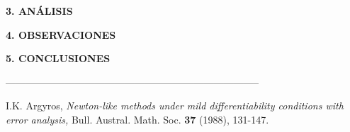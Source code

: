 \documentclass[10pt,a4paper]{article}
\begin{document}
\begin{multicols}{2}
\begin{center}
{\large \bf 3. AN\'ALISIS}	
\end{center}

\begin{center}
{\large \bf 4. OBSERVACIONES}
\end{center}

\begin{center}
{\large \bf 5. CONCLUSIONES}
\end{center}


\end{multicols}

\begin{center}
 -----------------------------------------------------------------------------
\end{center}
\begin{multicols}{2}
\begin{list}{}{\setlength{\topsep}{0mm}\setlength{\itemsep}{0mm}%
\setlength{\parsep}{0mm}\setlength{\leftmargin}{4mm}}
%
\small
\item[1.] I.K. Argyros, \textit{Newton-like methods under mild \linebreak differentiability conditions with error analysis,} Bull. \linebreak Austral. Math. Soc. \textbf{37} (1988), 131-147.
\item[2.] 
%
\end{list}
\end{multicols}
\end{document}
